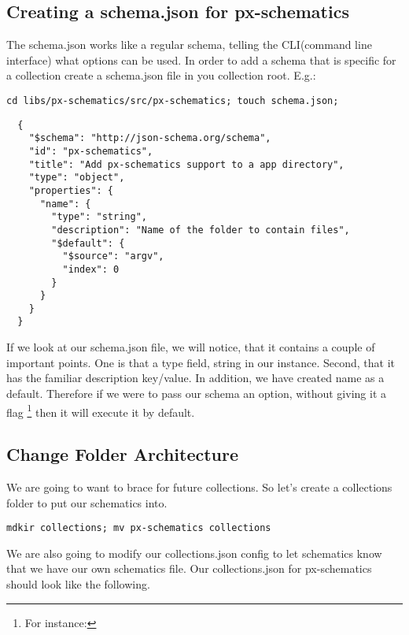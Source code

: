 \subsection{ Creating a schema.json for px-schematics }
The schema.json works like a regular schema, telling the CLI(command line
interface) what options can be used. In order to add a schema that is specific
for a collection create a schema.json file in you collection root. E.g.:
\begin{verbatim}
cd libs/px-schematics/src/px-schematics; touch schema.json;
\end{verbatim}

\begin{lstlisting}
  {
    "$schema": "http://json-schema.org/schema",
    "id": "px-schematics",
    "title": "Add px-schematics support to a app directory",
    "type": "object",
    "properties": {
      "name": {
        "type": "string",
        "description": "Name of the folder to contain files",
        "$default": {
          "$source": "argv",
          "index": 0
        }
      }
    }
  }
\end{lstlisting}
If we look at our schema.json file, we will notice, that it contains a couple
of important points. One is that a type field, string in our instance. Second,
that it has the familiar description key/value. In addition, we have created
name as a default. Therefore if we were to pass our schema an option, without
giving it a flag \footnote{For instance: }
then it will execute it by default.

\subsection{ Change Folder Architecture }
We are going to want to brace for future collections. So let's create a
collections folder to put our schematics into.
\begin{verbatim}
mdkir collections; mv px-schematics collections
\end{verbatim}

We are also going to modify our collections.json config to let schematics know
that we have our own schematics file. Our collections.json for px-schematics
should look like the following.
